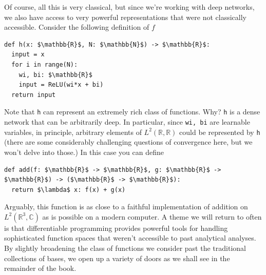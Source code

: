 \documentclass[book.tex]{subfiles}
\begin{document}
Of course, all this is very classical, but since we're working with deep networks, we also have access to very powerful representations that were not classically accessible. Consider the following definition of $f$

\begin{lstlisting}
def h(x: $\mathbb{R}$, N: $\mathbb{N}$) -> $\mathbb{R}$:
  input = x
  for i in range(N):
    wi, bi: $\mathbb{R}$
    input = ReLU(wi*x + bi)
  return input
\end{lstlisting}

\noindent Note that \lstinline{h} can represent an extremely rich class of functions. Why? \lstinline{h} is a dense network that can be arbitrarily deep. In particular, since \lstinline{wi, bi} are learnable variables, in principle, arbitrary elements of $L^2(\mathbb{R}, \mathbb{R})$ could be represented by \lstinline{h} (there are some considerably challenging questions of convergence here, but we won't delve into those.) In this case you can define

\begin{lstlisting}
def add(f: $\mathbb{R}$ -> $\mathbb{R}$, g: $\mathbb{R}$ -> $\mathbb{R}$) -> ($\mathbb{R}$ -> $\mathbb{R}$):
  return $\lambda$ x: f(x) + g(x)
\end{lstlisting}
\noindent Arguably, this function is as close to a faithful implementation of addition on $L^2(\mathbb{R}^3, \mathbb{C})$ as is possible on a modern computer. A theme we will return to often is that differentiable programming provides powerful tools for handling sophisticated function spaces that weren't accessible to past analytical analyses. By slightly broadening the class of functions we consider past the traditional collections of bases, we open up a variety of doors as we shall see in the remainder of the book.
\end{document}
